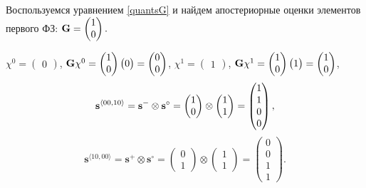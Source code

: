 Воспользуемся уравнением \ref{quantsG} и найдем апостериорные оценки элементов первого ФЗ: $\mathbf{G} = \begin{pmatrix} 1 \\ 0 \end{pmatrix}.$

$\chi^0 = \begin{pmatrix} 0 \end{pmatrix} $, 
$\mathbf{G}\chi^0  = \begin{pmatrix} 1 \\ 0  \end{pmatrix}\begin{pmatrix} 0 \end{pmatrix}  = \begin{pmatrix}  0 \\ 0 \end{pmatrix}$,
$\chi^1 = \begin{pmatrix} 1 \end{pmatrix} $, 
$\mathbf{G} \chi^1  =\begin{pmatrix} 1 \\ 0 \end{pmatrix} \begin{pmatrix} 1 \end{pmatrix}  = \begin{pmatrix}  1 \\ 0 \end{pmatrix}$,
\begin{equation*}
\mathbf{s}^{\langle 00, 10 \rangle} = \mathbf{s}^- \otimes \mathbf{s}^\circ =  \begin{pmatrix} 1 \\ 0 \end{pmatrix} \otimes \begin{pmatrix}  1 \\ 1 \end{pmatrix} = \begin{pmatrix}  1 \\ 1 \\ 0 \\ 0 \end{pmatrix},
\end{equation*}
\begin{equation*}
\mathbf{s}^{\langle 10, 00 \rangle} = \mathbf{s}^+ \otimes \mathbf{s}^\circ = 
\begin{pmatrix} 0 \\ 1 \end{pmatrix} \otimes \begin{pmatrix}  1 \\ 1 \end{pmatrix} = \begin{pmatrix}  0 \\ 0 \\ 1 \\ 1 \end{pmatrix}.
\end{equation*}

